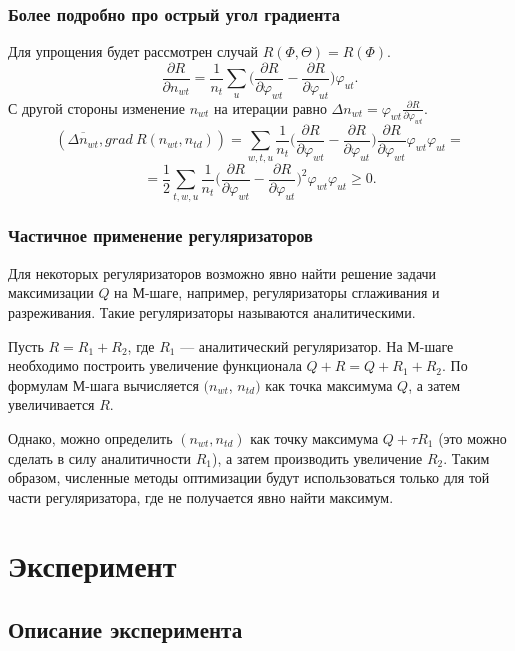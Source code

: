 \documentclass[utf8]{beamer}
\renewcommand{\geq}{\geqslant}
\renewcommand{\phi}{\varphi}
\begin{document}
\begin{frame}
\frametitle{Более подробно про острый угол градиента}

Для упрощения будет рассмотрен случай $R(\Phi, \Theta) = R(\Phi)$.
\[
\frac{\partial{R}}{\partial{n_{wt}}}  = \frac{1}{n_t} \sum_{u} \bigg(\frac{\partial{R}}{\partial{\phi_{wt}}}  -  \frac{\partial{R}}{\partial{\phi_{ut}}} \bigg)  \phi_{ut}.
\]
С другой стороны изменение $n_{wt}$ на итерации равно $ \Delta n_{wt} =  \phi_{wt} \frac{\partial{R}}{\partial{\phi_{wt}}}$.
\[
(\overline{\Delta n_{wt}}, grad\ R(n_{wt}, n_{td})) = \sum\limits_{w, t, u}  \frac{1}{n_{t}}  \bigg(  \frac{\partial{R}}{\partial{\phi_{wt}}}  -  \frac{\partial{R}}{\partial{\phi_{ut}}}  \bigg)  \frac{\partial{R}}{\partial{\phi_{wt}}} \phi_{wt} \phi_{ut}  = 
\]
\[
= \frac12  \sum\limits_{t, w, u}  \frac{1}{n_{t}} \bigg(  \frac{\partial{R}}{\partial{\phi_{wt}}}  -  \frac{\partial{R}}{\partial{\phi_{ut}}}  \bigg)^2 \phi_{wt} \phi_{ut}  \geq 0.
\]
\end{frame}

\begin{frame}
\frametitle{Частичное применение регуляризаторов}
Для некоторых регуляризаторов возможно явно найти решение  задачи  максимизации  $Q$ на М-шаге, например, регуляризаторы сглаживания и разреживания. Такие регуляризаторы называются аналитическими.
\medskip

Пусть $R = R_1 + R_2$, где $R_1$ --- аналитический регуляризатор. На М-шаге необходимо построить увеличение функционала $Q + R = Q + R_1 + R_2$. По формулам М-шага вычисляется $(n_{wt}$, $n_{td})$ как точка максимума $Q$, а затем увеличивается $R$.  
\medskip

Однако, можно определить $(n_{wt},n_{td})$ как точку максимума $Q + \tau R_1 $ (это можно сделать в силу аналитичности $R_1$), а затем производить увеличение $R_2$. Таким образом,  численные методы оптимизации будут использоваться только для той части регуляризатора, где не получается явно найти максимум.
\end{frame}

\section{Эксперимент}
\subsection{Описание эксперимента}
	
\end{document}
